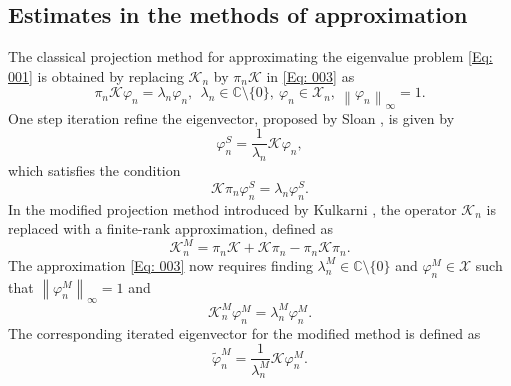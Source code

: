 \documentclass[pdflatex, sn-mathphys-num]{sn-jnl}%
\newcommand{\norm}[1]{\left\lVert #1\right\rVert}
\theoremstyle{thmstyleone}%
\theoremstyle{thmstyletwo}%
\theoremstyle{thmstylethree}%
\begin{document}
\subsection{Estimates in the methods of approximation}

The classical projection method for approximating the eigenvalue problem \eqref{Eq: 001} is obtained by replacing $\mathcal{K}_n$ by $\pi_n \mathcal{K}$ in \eqref{Eq: 003} as
\begin{equation} \label{Eq: 0013}
	\pi_n \mathcal{K} \varphi_n = \lambda_n \varphi_n,  ~~\lambda_n \in \mathbb{C} \setminus \{0\}, ~ \varphi_n \in \mathcal{X}_n, ~\norm{\varphi_n}_\infty =1.
\end{equation}
One step iteration refine the eigenvector, proposed by Sloan \cite{Sloan1}, is given by
\begin{equation} \label{Eq: 0014}
	\varphi_n^S = \frac{1}{\lambda_n} \mathcal{K} \varphi_n,
\end{equation}
which satisfies the condition
\[
\mathcal{K} \pi_n \varphi_n^S = \lambda_n \varphi_n^S.
\]
In the modified projection method introduced by Kulkarni \cite{RPK5}, the operator $\mathcal{K}_n$ is replaced with a finite-rank approximation, defined as
\begin{equation} \label{Eq: 0015}
	\mathcal{K}_n^M = \pi_n \mathcal{K} +\mathcal{K} \pi_n - \pi_n \mathcal{K} \pi_n.
\end{equation}
The approximation \eqref{Eq: 003} now requires finding $\lambda_n^M \in \mathbb{C} \setminus \{0\}$ and $\varphi_n^M \in \mathcal{X}$ such that $\norm{\varphi_n^M}_\infty = 1$ and
\begin{equation} \label{Eq: 0016}
	\mathcal{K}_n^M \varphi_n^M = \lambda_n^M \varphi_n^M. 
\end{equation}
The corresponding iterated eigenvector for the modified method is defined as
\begin{equation} \label{Eq: 0017}
	\widetilde{\varphi}_n^M = \frac{1}{\lambda_n^M} \mathcal{K} \varphi_n^M. 
\end{equation}
\end{document}
